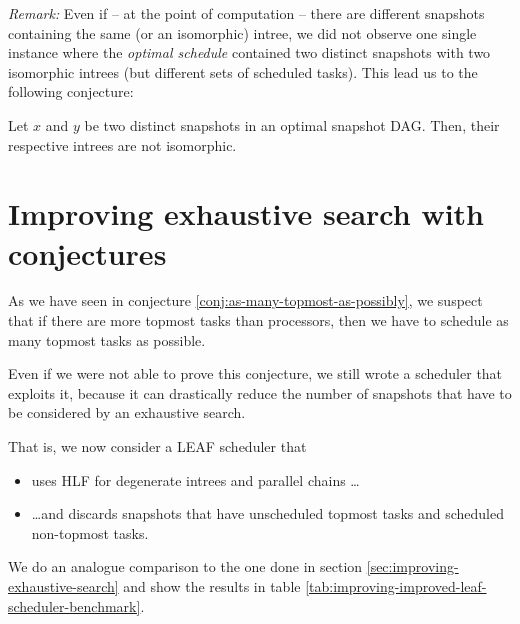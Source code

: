 \emph{Remark:} Even if -- at the point of computation -- there are different snapshots containing the same (or an isomorphic) intree, we did not observe one single instance where the \emph{optimal schedule} contained two distinct snapshots with two isomorphic intrees (but different sets of scheduled tasks). This lead us to the following conjecture:

\begin{conjecture}
  Let $x$ and $y$ be two distinct snapshots in an optimal snapshot DAG. Then, their respective intrees are not isomorphic.
\end{conjecture}

\section{Improving exhaustive search with conjectures}
\label{sec:improving-leaf-with-conjectures}

As we have seen in conjecture \ref{conj:as-many-topmost-as-possibly}, we suspect that if there are more topmost tasks than processors, then we have to schedule as many topmost tasks as possible. 

Even if we were not able to prove this conjecture, we still wrote a scheduler that exploits it, because it can drastically reduce the number of snapshots that have to be considered by an exhaustive search.

That is, we now consider a LEAF scheduler that
\begin{itemize}
\item uses HLF for degenerate intrees and parallel chains \dots
\item \dots and discards snapshots that have unscheduled topmost tasks and scheduled non-topmost tasks.
\end{itemize}

We do an analogue comparison to the one done in section \ref{sec:improving-exhaustive-search} and show the results in table \ref{tab:improving-improved-leaf-scheduler-benchmark}.


